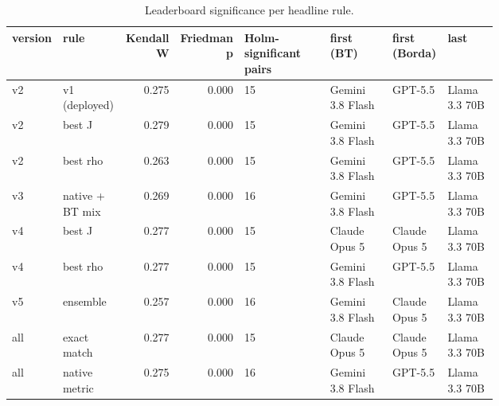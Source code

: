 \begin{table}[htbp]
\centering\tiny
\caption{Leaderboard significance per headline rule.}
\label{tab:cmp_significance}
\setlength{\tabcolsep}{3pt}
\begin{tabular}{lp{0.134\linewidth}rrp{0.197\linewidth}p{0.143\linewidth}p{0.117\linewidth}p{0.117\linewidth}}
\toprule
version & rule & Kendall W & Friedman p & Holm-significant pairs & first (BT) & first (Borda) & last \\
\midrule
v2 & v1 (deployed) & 0.275 & 0.000 & 15 & Gemini 3.8 Flash & GPT-5.5 & Llama 3.3 70B \\
v2 & best J & 0.279 & 0.000 & 15 & Gemini 3.8 Flash & GPT-5.5 & Llama 3.3 70B \\
v2 & best rho & 0.263 & 0.000 & 15 & Gemini 3.8 Flash & GPT-5.5 & Llama 3.3 70B \\
v3 & native + BT mix & 0.269 & 0.000 & 16 & Gemini 3.8 Flash & GPT-5.5 & Llama 3.3 70B \\
v4 & best J & 0.277 & 0.000 & 15 & Claude Opus 5 & Claude Opus 5 & Llama 3.3 70B \\
v4 & best rho & 0.277 & 0.000 & 15 & Gemini 3.8 Flash & GPT-5.5 & Llama 3.3 70B \\
v5 & ensemble & 0.257 & 0.000 & 16 & Gemini 3.8 Flash & Claude Opus 5 & Llama 3.3 70B \\
all & exact match & 0.277 & 0.000 & 15 & Claude Opus 5 & Claude Opus 5 & Llama 3.3 70B \\
all & native metric & 0.275 & 0.000 & 16 & Gemini 3.8 Flash & GPT-5.5 & Llama 3.3 70B \\
\bottomrule
\end{tabular}
\end{table}
